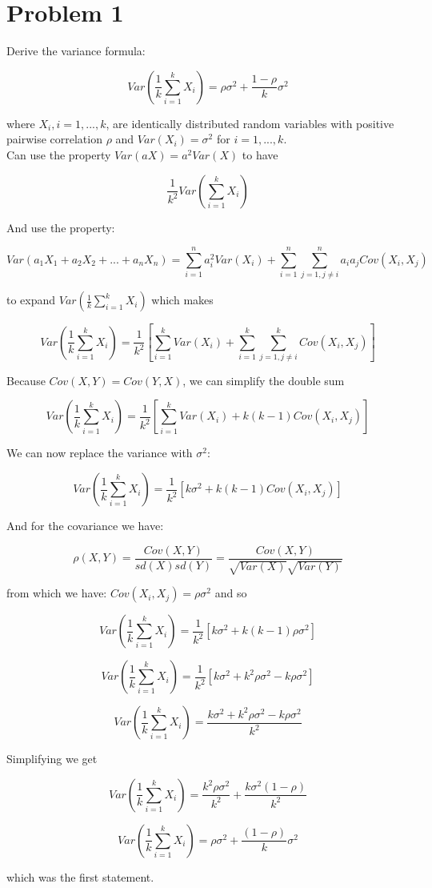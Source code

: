 \section*{Problem 1}

Derive the variance formula: 

\[ Var(\frac{1}{k} \sum\limits_{i=1}^k X_i ) = \rho\sigma^2 + \frac{1 - \rho}{k}\sigma^2 \]

where $X_i , i = 1,...,k$, are identically distributed random variables with positive pairwise correlation $\rho$ and $Var(X_i) = \sigma^2 $ for $ i = 1,...,k$. \\


\noindent Can use the property $Var(aX) = a^2Var(X)$ to have

\[ \frac{1}{k^2}Var(\sum\limits_{i=1}^k X_i) \]


\noindent And use the property: 

\[ Var(a_1X_1 + a_2X_2 + ... + a_nX_n) = \sum_{i=1}^{n} a_i^2Var(X_i) + \sum_{i=1}^{n}\sum_{j=1, j \neq i}^{n}a_i a_j Cov(X_i, X_j) \]

\noindent to expand $Var(\frac{1}{k} \sum_{i=1}^{k} X_i )$ which makes

\[ Var(\frac{1}{k} \sum\limits_{i=1}^k X_i ) = \frac{1}{k^2}[ \sum\limits_{i=1}^kVar(X_i) + \sum\limits_{i=1}^k \sum\limits_{j=1, j \neq i}^k Cov(X_i, X_j)]  \]


\noindent Because $Cov(X,Y) = Cov(Y,X)$, we can simplify the double sum 

\[ Var(\frac{1}{k} \sum\limits_{i=1}^k X_i ) = \frac{1}{k^2}[ \sum\limits_{i=1}^kVar(X_i) + k(k - 1) Cov(X_i, X_j)] \]

\noindent We can now replace the variance with $\sigma^2$:
 
\[ Var(\frac{1}{k} \sum\limits_{i=1}^k X_i ) = \frac{1}{k^2}[ k\sigma^2 + k(k - 1) Cov(X_i, X_j)] \] 


\noindent And for the covariance we have: 

\[ \rho(X,Y) = \frac{Cov(X,Y)}{sd(X) sd(Y)} = \frac{Cov(X,Y)}{\sqrt{Var(X)} \sqrt{Var(Y)}} \]

\noindent from which we have: $Cov(X_i, X_j) = \rho\sigma^2$ and so

\[ Var(\frac{1}{k} \sum\limits_{i=1}^k X_i ) = \frac{1}{k^2}[ k\sigma^2 + k(k - 1)\rho\sigma^2] \]

\[ Var(\frac{1}{k} \sum\limits_{i=1}^k X_i ) = \frac{1}{k^2}[ k\sigma^2 + k^2\rho\sigma^2 - k\rho\sigma^2] \]

\[ Var(\frac{1}{k} \sum\limits_{i=1}^k X_i ) = \frac{k\sigma^2 + k^2\rho\sigma^2 - k\rho\sigma^2}{k^2} \]


\noindent Simplifying we get

\[ Var(\frac{1}{k} \sum\limits_{i=1}^k X_i ) = \frac{k^2\rho\sigma^2}{k^2} + \frac{k\sigma^2(1-\rho)}{k^2} \]

\[ Var(\frac{1}{k} \sum\limits_{i=1}^k X_i ) = \rho\sigma^2 + \frac{(1-\rho)}{k}\sigma^2 \]

\noindent which was the first statement. 







